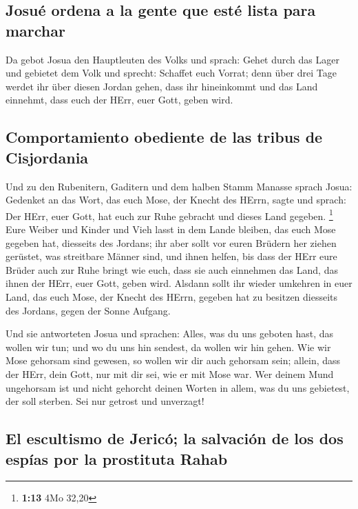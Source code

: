 \hypertarget{josuuxe9-ordena-a-la-gente-que-estuxe9-lista-para-marchar}{%
\subsection{Josué ordena a la gente que esté lista para
marchar}\label{josuuxe9-ordena-a-la-gente-que-estuxe9-lista-para-marchar}}

 Da gebot Josua den Hauptleuten des Volks und sprach:
 Gehet durch das Lager und gebietet dem Volk und sprecht:
Schaffet euch Vorrat; denn über drei Tage werdet ihr über diesen Jordan
gehen, dass ihr hineinkommt und das Land einnehmt, dass euch der HErr,
euer Gott, geben wird.

\hypertarget{comportamiento-obediente-de-las-tribus-de-cisjordania}{%
\subsection{Comportamiento obediente de las tribus de
Cisjordania}\label{comportamiento-obediente-de-las-tribus-de-cisjordania}}

 Und zu den Rubenitern, Gaditern und dem halben Stamm
Manasse sprach Josua:  Gedenket an das Wort, das euch
Mose, der Knecht des HErrn, sagte und sprach: Der HErr, euer Gott, hat
euch zur Ruhe gebracht und dieses Land gegeben. \footnote{\textbf{1:13}
  4Mo 32,20}  Eure Weiber und Kinder und Vieh lasst in
dem Lande bleiben, das euch Mose gegeben hat, diesseits des Jordans; ihr
aber sollt vor euren Brüdern her ziehen gerüstet, was streitbare Männer
sind, und ihnen helfen,  bis dass der HErr eure Brüder
auch zur Ruhe bringt wie euch, dass sie auch einnehmen das Land, das
ihnen der HErr, euer Gott, geben wird. Alsdann sollt ihr wieder umkehren
in euer Land, das euch Mose, der Knecht des HErrn, gegeben hat zu
besitzen diesseits des Jordans, gegen der Sonne Aufgang.

 Und sie antworteten Josua und sprachen: Alles, was du
uns geboten hast, das wollen wir tun; und wo du uns hin sendest, da
wollen wir hin gehen.  Wie wir Mose gehorsam sind
gewesen, so wollen wir dir auch gehorsam sein; allein, dass der HErr,
dein Gott, nur mit dir sei, wie er mit Mose war.  Wer
deinem Mund ungehorsam ist und nicht gehorcht deinen Worten in allem,
was du uns gebietest, der soll sterben. Sei nur getrost und unverzagt!

\hypertarget{el-escultismo-de-jericuxf3-la-salvaciuxf3n-de-los-dos-espuxedas-por-la-prostituta-rahab}{%
\subsection{El escultismo de Jericó; la salvación de los dos espías por
la prostituta
Rahab}\label{el-escultismo-de-jericuxf3-la-salvaciuxf3n-de-los-dos-espuxedas-por-la-prostituta-rahab}}

